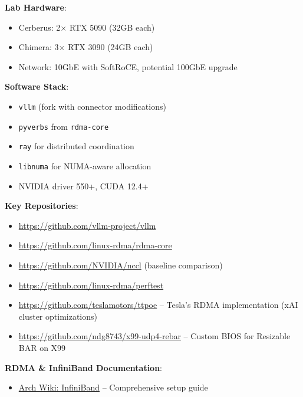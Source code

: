 \documentclass[10pt,letterpaper]{article}
\begin{document}
\textbf{Lab Hardware}:
\begin{itemize}[noitemsep]
    \item Cerberus: 2$\times$ RTX 5090 (32GB each)
    \item Chimera: 3$\times$ RTX 3090 (24GB each)
    \item Network: 10GbE with SoftRoCE, potential 100GbE upgrade
\end{itemize}

\textbf{Software Stack}:
\begin{itemize}[noitemsep]
    \item \texttt{vllm} (fork with connector modifications)
    \item \texttt{pyverbs} from \texttt{rdma-core}
    \item \texttt{ray} for distributed coordination
    \item \texttt{libnuma} for NUMA-aware allocation
    \item NVIDIA driver 550+, CUDA 12.4+
\end{itemize}

\textbf{Key Repositories}:
\begin{itemize}[noitemsep]
    \item \url{https://github.com/vllm-project/vllm}
    \item \url{https://github.com/linux-rdma/rdma-core}
    \item \url{https://github.com/NVIDIA/nccl} (baseline comparison)
    \item \url{https://github.com/linux-rdma/perftest}
    \item \url{https://github.com/teslamotors/ttpoe} -- Tesla's RDMA implementation (xAI cluster optimizations)
    \item \url{https://github.com/ndg8743/x99-udp4-rebar} -- Custom BIOS for Resizable BAR on X99
\end{itemize}

\textbf{RDMA \& InfiniBand Documentation}:
\begin{itemize}[noitemsep]
    \item \href{https://wiki.archlinux.org/title/InfiniBand}{Arch Wiki: InfiniBand} -- Comprehensive setup guide
\end{itemize}
\end{document}
